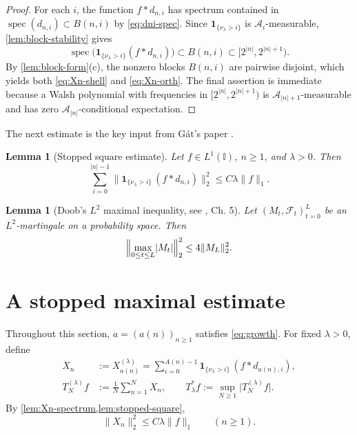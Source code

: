 \documentclass[11pt]{amsart}
\numberwithin{equation}{section}
\DeclareMathOperator{\spec}{spec}
\newtheorem{lemma}[theorem]{Lemma}
\theoremstyle{remark}
\begin{document}
\begin{proof}
For each $i$, the function $f*d_{n,i}$ has spectrum contained in $\spec%
(d_{n,i})\subset B(n,i)$ by \eqref{eq:dni-spec}. Since $\mathbf{1}%
_{\{\nu_\lambda>i\}}$ is $\mathcal{A}_i$-measurable, %
\cref{lem:block-stability} gives 
\begin{equation*}
\spec\bigl(\mathbf{1}_{\{\nu_\lambda>i\}}(f*d_{n,i})\bigr)\subset
B(n,i)\subset [2^{|n|},2^{|n|+1}). 
\end{equation*}
By \cref{lem:block-form}(c), the nonzero blocks $B(n,i)$ are pairwise
disjoint, which yields both \eqref{eq:Xn-shell} and \eqref{eq:Xn-orth}. The
final assertion is immediate because a Walsh polynomial with frequencies in $%
[2^{|n|},2^{|n|+1})$ is $\mathcal{A}_{|n|+1}$-measurable and has zero $%
\mathcal{A}_{|n|}$-conditional expectation.
\end{proof}

The next estimate is the key input from G\'{a}t's paper \cite{Gat2010}.

\begin{lemma}[Stopped square estimate]
\label{lem:stopped-square} Let $f\in L^1(\mathbb{I})$, $n\ge1$, and $%
\lambda>0$. Then 
\begin{equation}
\sum_{i=0}^{|n|-1}\lVert \mathbf{1}_{\{\nu_\lambda>i\}}\,(f*d_{n,i})%
\rVert_2^2 \le C\lambda\lVert f\rVert_1.  \label{eq:stopped-square}
\end{equation}
\end{lemma}



\begin{lemma}[Doob's $L^2$ maximal inequality, see \cite{Durr}, Ch. 5]
\label{lem:doob} Let $(M_t,\mathcal{F}_t)_{t=0}^L$ be an $L^2$-martingale on
a probability space. Then 
\begin{equation*}
\Bigl\|\max_{0\le t\le L}\lvert M_t\rvert\Bigr\|_2^2\le 4\lVert
M_L\rVert_2^2. 
\end{equation*}
\end{lemma}

\section{A stopped maximal estimate}

Throughout this section, $a=(a(n))_{n\ge1}$ satisfies \eqref{eq:growth}. For
fixed $\lambda>0$, define 
\begin{align}
X_n&:=X_{a(n)}^{(\lambda)}=\sum_{i=0}^{A(n)-1}\mathbf{1}_{\{\nu_\lambda>i\}}%
\,(f*d_{a(n),i}),  \label{eq:Tlambda-def-a} \\
T_N^{(\lambda)}f&:=\frac1N\sum_{n=1}^N X_n, \qquad
T_\lambda^*f:=\sup_{N\ge1}\lvert T_N^{(\lambda)}f\rvert.
\label{eq:Tlambda-def}
\end{align}
By \cref{lem:Xn-spectrum,lem:stopped-square}, 
\begin{equation}
\lVert X_n\rVert_2^2\le C\lambda\lVert f\rVert_1 \qquad (n\ge1).
\label{eq:Xn-l2-bound}
\end{equation}
\end{document}
